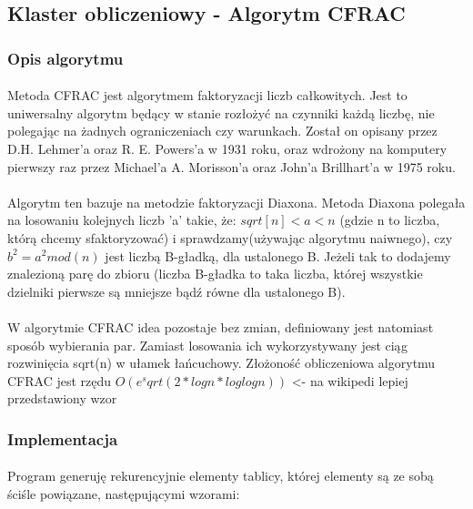 \documentclass{article}
\begin{document}
\subsection{Klaster obliczeniowy - Algorytm CFRAC}
\subsubsection{Opis algorytmu\cite{cfracwiki}\cite{cfracinz}}
\paragraph{}Metoda CFRAC  jest algorytmem faktoryzacji liczb całkowitych. Jest to uniwersalny algorytm będący w stanie rozłożyć na czynniki każdą liczbę, nie polegając na żadnych ograniczeniach czy warunkach. Został on opisany przez D.H. Lehmer'a oraz R. E. Powers'a w 1931 roku, oraz wdrożony na komputery pierwszy raz przez Michael'a A. Morisson'a oraz John'a Brillhart'a w 1975 roku.

\paragraph{}Algorytm ten bazuje na metodzie faktoryzacji Diaxona. Metoda Diaxona polegała na losowaniu kolejnych liczb 'a' takie, że:
$sqrt[n] < a < n$ (gdzie n to liczba, którą chcemy sfaktoryzować)
i sprawdzamy(używając algorytmu naiwnego), czy $b^2 = a^2mod(n)$ jest liczbą B-gładką, dla ustalonego B. Jeżeli tak to dodajemy znalezioną parę do zbioru (liczba B-gładka to taka liczba, której wszystkie dzielniki pierwsze są mniejsze bądź równe dla ustalonego B).

\paragraph{}W algorytmie CFRAC idea pozostaje bez zmian, definiowany jest natomiast sposób wybierania par. Zamiast losowania ich wykorzystywany jest ciąg rozwinięcia sqrt(n) w ułamek łańcuchowy. Złożoność obliczeniowa algorytmu CFRAC jest rzędu $O(e^sqrt(2* logn * loglog n))$ <- na wikipedi lepiej przedstawiony wzor

\subsubsection{Implementacja\cite{cfracimpl}}
\paragraph{}Program generuję rekurencyjnie elementy tablicy, której elementy są ze sobą ściśle powiązane, następującymi wzorami:
\end{document}
